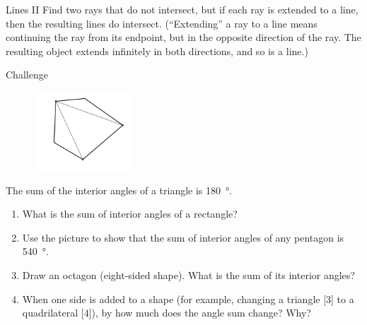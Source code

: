 \documentclass[14pt,letterpaper]{article}
\begin{document}
\begin{problem}{Lines II}
 Find two rays that do not intersect, but if each ray is extended to a line,
 then the resulting lines do intersect. (``Extending'' a ray to a line means
 continuing the ray from its endpoint, but in the opposite direction of the ray.
 The resulting object extends infinitely in both directions, and so is a line.)
\end{problem}

\begin{problem}{Challenge}

\begin{figure}
 \includegraphics[width=10em]{pentagon.png}
\end{figure}

The sum of the interior angles of a triangle is \SI{180}{\degree}.

\begin{enumerate}
 \item What is the sum of interior angles of a rectangle?
 \item Use the picture to show that the sum of interior angles of any pentagon
 is \SI{540}{\degree}.
 \item Draw an octagon (eight-sided shape). What is the sum of its interior
 angles?
 \item When one side is added to a shape (for example, changing a triangle [$3$]
 to a quadrilateral [$4$]), by how much does the angle sum change? Why?
\end{enumerate}

\end{problem}
\end{document}
